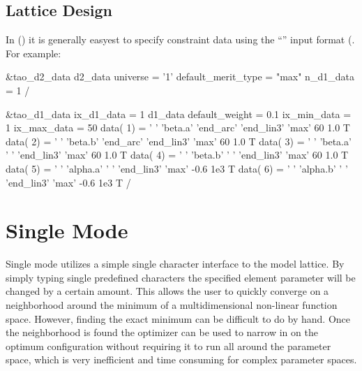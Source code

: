 \subsection{Lattice Design}
\label{ss:lattice_design}

In  () it is generally
easyest to specify constraint data using the ``''
input format (. For example:
\begin{example}
&tao_d2_data
  d2_data%
  universe = '1'
  default_merit_type = "max"
  n_d1_data = 1
/

&tao_d1_data
  ix_d1_data = 1
  d1_data%
  default_weight = 0.1
  ix_min_data = 1
  ix_max_data = 50
  data( 1) = ' '  'beta.a'  'end_arc' 'end_lin3' 'max'    60   1.0   T
  data( 2) = ' '  'beta.b'  'end_arc' 'end_lin3' 'max'    60   1.0   T
  data( 3) = ' '  'beta.a'  ' '       'end_lin3' 'max'    60   1.0   T
  data( 4) = ' '  'beta.b'  ' '       'end_lin3' 'max'    60   1.0   T
  data( 5) = ' '  'alpha.a' ' '       'end_lin3' 'max'   -0.6  1e3   T 
  data( 6) = ' '  'alpha.b' ' '       'end_lin3' 'max'   -0.6  1e3   T 
/
\end{example}


\section{Single Mode}
\label{s:single_mode}

Single mode utilizes a simple single character interface to the \tao
model lattice.  By simply typing single predefined characters the
specified element parameter will be changed by a certain amount. This
allows the user to quickly converge on a neighborhood around the
minimum of a multidimensional non-linear function space. However,
finding the exact minimum can be difficult to do by hand. Once the
neighborhood is found the optimizer can be used to narrow in on the
optimum configuration without requiring it to run all around the
parameter space, which is very inefficient and time consuming for
complex parameter spaces.


